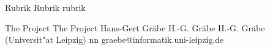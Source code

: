 \documentclass[a4paper,11pt]{article}
\begin{document}
\setcounter{footnote}{0}
\setcounter{figure}{0}


\Abschnitt
{Rubrik}
{Rubrik}
{rubrik}

\vspace{3mm}


\Aufsatz
{The {\SD} Project}
{The {\SD} Project}
{Hans-Gert Gr\"abe}
{H.-G. Gr\"abe}
{H.-G. Gr\"abe\\(Universit"at Leipzig)}
{nn}
{graebe@informatik.uni-leipzig.de}

\vspace{3mm}
\end{document}
